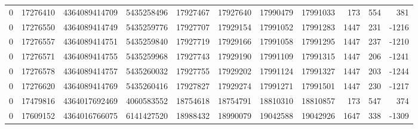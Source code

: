 \begin{tabular}{rrrrrrrrrrr}
0 & 17276410 & 4364089414709 & 5435258496 & 17927467 & 17927640 & 17990479 & 17991033 & 173 & 554 & 381 \\
0 & 17276550 & 4364089414749 & 5435259776 & 17927707 & 17929154 & 17991052 & 17991283 & 1447 & 231 & -1216 \\
0 & 17276557 & 4364089414751 & 5435259840 & 17927719 & 17929166 & 17991058 & 17991295 & 1447 & 237 & -1210 \\
0 & 17276571 & 4364089414755 & 5435259968 & 17927743 & 17929190 & 17991109 & 17991315 & 1447 & 206 & -1241 \\
0 & 17276578 & 4364089414757 & 5435260032 & 17927755 & 17929202 & 17991124 & 17991327 & 1447 & 203 & -1244 \\
0 & 17276620 & 4364089414769 & 5435260416 & 17927827 & 17929274 & 17991271 & 17991501 & 1447 & 230 & -1217 \\
0 & 17479816 & 4364017692469 & 4060583552 & 18754618 & 18754791 & 18810310 & 18810857 & 173 & 547 & 374 \\
0 & 17609152 & 4364016766075 & 6141427520 & 18988432 & 18990079 & 19042588 & 19042926 & 1647 & 338 & -1309 \\
\bottomrule
\end{tabular}
